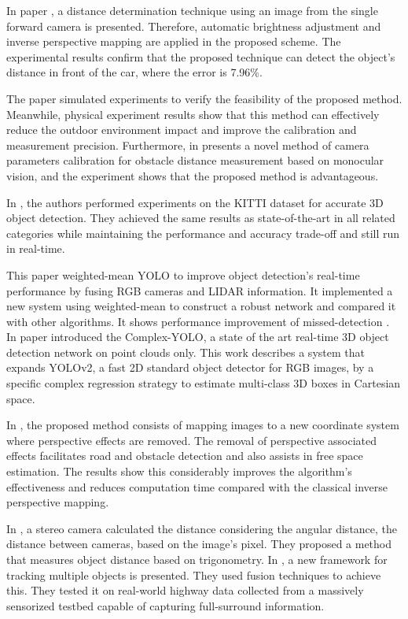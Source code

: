 In paper \cite{Wongsaree2018}, a distance determination technique using an image from the single forward camera is presented. Therefore, automatic brightness adjustment and inverse perspective mapping are applied in the proposed scheme. The experimental results confirm that the proposed technique can detect the object's distance in front of the car, where the error is 7.96\%.

The paper \cite{Pan2019} simulated experiments to verify the feasibility of the proposed method. Meanwhile, physical experiment results show that this method can effectively reduce the outdoor environment impact and improve the calibration and measurement precision. Furthermore, in \cite{Lin2014} presents a novel method of camera parameters calibration for obstacle distance measurement based on monocular vision, and the experiment shows that the proposed method is advantageous.

In \cite{Simon2019a}, the authors performed experiments on the KITTI dataset for accurate 3D object detection. They achieved the same results as state-of-the-art in all related categories while maintaining the performance and accuracy trade-off and still run in real-time.


This paper weighted-mean YOLO to improve object detection's real-time performance by fusing RGB cameras and LIDAR information. It implemented a new system using weighted-mean to construct a robust network and compared it with other algorithms. It shows performance improvement of missed-detection \cite{Kim2019}. In paper \cite{Simon2019} introduced the Complex-YOLO, a state of the art real-time 3D object detection network on point clouds only. This work describes a system that expands YOLOv2, a fast 2D standard object detector for RGB images, by a specific complex regression strategy to estimate multi-class 3D boxes in Cartesian space. 

In \cite{Oliveira2015}, the proposed method consists of mapping images to a new coordinate system where perspective effects are removed. The removal of perspective associated effects facilitates road and obstacle detection and also assists in free space estimation. The results show this considerably improves the algorithm's effectiveness and reduces computation time compared with the classical inverse perspective mapping.

In \cite{Salman2017}, a stereo camera calculated the distance considering the angular distance, the distance between cameras, based on the image's pixel. They proposed a method that measures object distance based on trigonometry.  In \cite{Rangesh2019}, a new framework for tracking multiple objects is presented. They used fusion techniques to achieve this. They tested it on real-world highway data collected from a massively sensorized testbed capable of capturing full-surround information.

